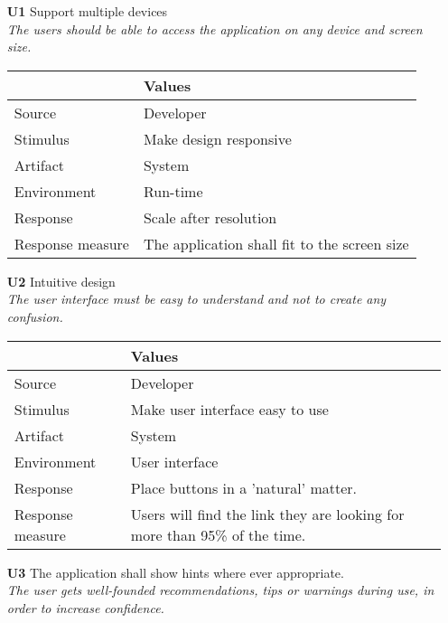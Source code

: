 \begin{itemize}
    \item[\textbf{U1}] Support multiple devices \\
    \textit{\small{The users should be able to access the application on any device and screen size.}}
        
    \begin{tabular}{| l | p{7cm} |}
        \hline
        \rowcolor[gray]{0.8}
        \textbf{} & \textbf{Values} \\
        \hline
        Source & Developer \\
        Stimulus & Make design responsive \\
        Artifact & System \\
        Environment & Run-time \\
        Response & Scale after resolution  \\
        Response measure & The application shall fit to the screen size \\
        \hline
    \end{tabular}   

    \item[\textbf{U2}] Intuitive design \\
    \textit{\small{The user interface must be easy to understand and not to create any confusion.}}
        
    \begin{tabular}{| l | p{7cm} |}
        \hline
        \rowcolor[gray]{0.8}
        \textbf{} & \textbf{Values} \\
        \hline
        Source & Developer \\
        Stimulus & Make user interface easy to use \\
        Artifact & System \\
        Environment & User interface \\
        Response & Place buttons in a 'natural' matter. \\
        Response measure & Users will find the link they are looking for more than 95\% of the time. \\
        \hline
    \end{tabular}

    \item[\textbf{U3}] The application shall show hints where ever appropriate. \\
        \textit{\small{The user gets well-founded recommendations, tips or warnings during use, in order to increase confidence.}}
        

\end{itemize}
